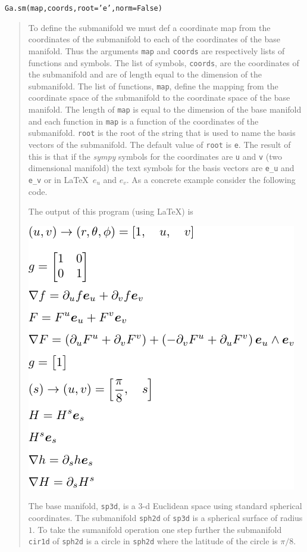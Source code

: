 \documentclass[12pt]{report}
\newcommand{\T}[1]{\texttt{#1}}
\newcommand{\includecode}[1]{}
\begin{document}
\T{Ga.sm(map,coords,root='e',norm=False)}
\begin{quote}
    To define the submanifold we must def a coordinate map from the coordinates of the submanifold to
    each of the coordinates of the base manifold.  Thus the arguments \T{map} and \T{coords} are
    respectively lists of functions and symbols.  The list of symbols, \T{coords}, are the coordinates of the
    submanifold and are of length equal to the dimension of the submanifold.  The list of functions, \T{map},
    define the mapping from the coordinate space of the submanifold to the coordinate space of the
    base manifold.  The length of \T{map} is equal to the dimension of the base manifold and each function in
    \T{map} is a function of the coordinates of the submanifold. \T{root} is the root of the string that is
    used to name the basis vectors of the submanifold.  The default value of \T{root} is \T{e}.  The result of
    this is that if the \emph{sympy} symbols for the coordinates are \T{u} and \T{v} (two dimensional manifold) the
    text symbols for the basis vectors are \T{e\_u} and \T{e\_v} or in \LaTeX\,  $e_{u}$ and $e_{v}$.  As a
    concrete example consider the following code.
    \includecode{python/submanifold.py}
    The output of this program (using \LaTeX) is
    \begin{center}
    \includegraphics[scale=0.9]{python/submanifold.pdf}
    \end{center}

    The base manifold, \T{sp3d}, is a 3-d Euclidean space using standard spherical coordinates. The submanifold
    \T{sph2d} of \T{sp3d} is a spherical surface of radius $1$.  To take the sumanifold operation one step further
    the submanifold \T{cir1d} of \T{sph2d} is a circle in \T{sph2d} where the latitude of the circle is $\pi/8$.


\end{quote}
\end{document}
